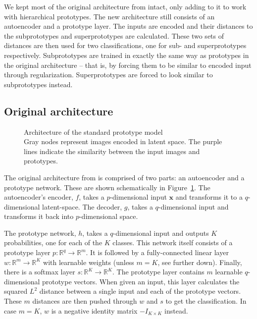 We kept most of the original architecture from \citep{li2018deep} intact, only adding to it to work with hierarchical prototypes. The new architecture still consists of an autoencoder and a prototype layer. The inputs are encoded and their distances to the subprototypes and superprototypes are calculated. These two sets of distances are then used for two classifications, one for sub- and superprototypes respectively. Subprototypes are trained in exactly the same way as prototypes in the original architecture -- that is, by forcing them to be similar to encoded input through regularization. Superprototypes are forced to look similar to subprototypes instead.

\subsection{Original architecture}
\begin{figure}[h]
    \centering
    
    \caption{Architecture of the standard prototype model \\ {\normalfont Gray nodes represent images encoded in latent space. The {\color{magenta} purple} lines indicate the similarity between the input images and prototypes.}}
    \label{fig:nonhierarchical}
\end{figure}

The original architecture from \citep{li2018deep} is comprised of two parts: an autoencoder \citep{autoencoderpaper} and a prototype network. These are shown schematically in Figure~\ref{fig:nonhierarchical}. The autoencoder's encoder, $f$, takes a $p$-dimensional input $\textbf{x}$ and transforms it to a $q$-dimensional latent-space. The decoder, $g$, takes a $q$-dimensional input and transforms it back into $p$-dimensional space. 

The prototype network, $h$, takes a $q$-dimensional input and outputs $K$ probabilities, one for each of the $K$ classes. This network itself consists of a prototype layer $p : \mathbb{R}^q\rightarrow \mathbb{R}^m$. It is  followed by a fully-connected linear layer $w : \mathbb{R}^m\rightarrow\mathbb{R}^K$ with learnable weights (unless $m = K$, see further down). Finally, there is a softmax layer $s : \mathbb{R}^K\rightarrow\mathbb{R}^K$. The prototype layer contains $m$ learnable $q$-dimensional prototype vectors. When given an input, this layer calculates the squared $L^2$ distance between a single input and each of the prototype vectors. These $m$ distances are then pushed through $w$ and $s$ to get the classification. In case $m = K$, $w$ is a negative identity matrix $-I_{K \times K}$ instead.

